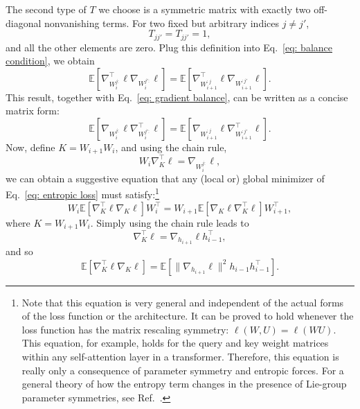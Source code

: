 \documentclass[11pt]{article}
\theoremstyle{plain}
\newcommand{\E}{\mathbb{E}}
\begin{document}
The second type of $T$ we choose is a symmetric matrix with exactly two off-diagonal nonvanishing terms. For two fixed but arbitrary indices $j\neq j'$,
\begin{equation}
        T_{jj'} = T_{jj'} = 1,
\end{equation}
and all the other elements are zero. Plug this definition into Eq.~\eqref{eq: balance condition}, we obtain
\begin{equation}
    {\E\left[ \nabla_{W_i^{j:}}^\top\ell \nabla_{W_i^{j':}}\ell \right]} = {\E\left[ \nabla_{W_{i+1}^{:j}}^\top\ell \nabla_{W_{i+1}^{:j'}}\ell \right]}.
\end{equation}
This result, together with Eq.~\eqref{eq: gradient balance}, can be written as a concise matrix form:
\begin{equation}
    \E\left[ \nabla_{W_i^{j:}}\ell \nabla_{W_i^{j':}}^\top\ell \right] = \E\left[ \nabla_{W_{i+1}^{:j}}\ell \nabla_{W_{i+1}^{:j'}}^\top\ell \right].
\end{equation}
Now, define $K = W_{i+1} W_i$, and using the chain rule, 
\begin{equation}
   W_i \nabla_{K}^\top \ell  = \nabla_{W_i^{j:}}\ell,
\end{equation}
we can obtain a suggestive equation that any (local or) global minimizer of Eq.~\eqref{eq: entropic loss} must satisfy:\footnote{Note that this equation is very general and independent of the actual forms of the loss function or the architecture. It can be proved to hold whenever the loss function has the matrix rescaling symmetry: $
\ell(W,U) = \ell(WU)$. This equation, for example, holds for the query and key weight matrices within any self-attention layer in a transformer. Therefore, this equation is really only a consequence of parameter symmetry and entropic forces. For a general theory of how the entropy term changes in the presence of Lie-group parameter symmetries, see Ref.~\cite{ziyin2025neural}.}
\begin{equation}\label{eq: gradient balance}
   \boxed{ W_i \E[ \nabla_{K}^\top \ell \nabla_{K} \ell  ] W_i^\top = W_{i+1} \E[ \nabla_{K} \ell \nabla_{K}^\top \ell  ] W_{i+1}^\top,}
\end{equation}
where $K = W_{i+1} W_i$. Simply using the chain rule leads to
\begin{equation}
    \nabla_{K}^\top \ell = \nabla_{h_{i+1}}\ell h_{i-1}^\top,
\end{equation}
and so 
\begin{equation}
    \E[\nabla_{K}^\top \ell \nabla_{K} \ell]  = \E[\|\nabla_{h_{i+1}}\ell\|^2 h_{i-1} h_{i-1}^\top].
\end{equation}
\end{document}
